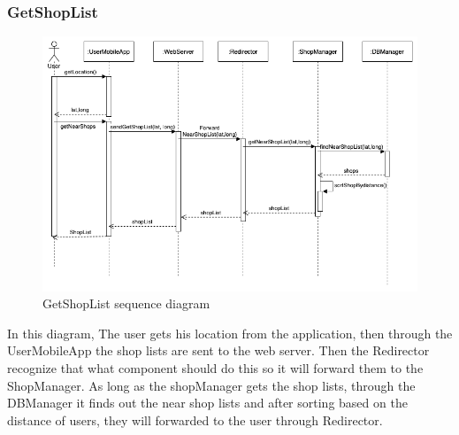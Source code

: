 \subsubsection{GetShopList}
\begin{figure}[H]
  \centering
  \includegraphics[width=\textwidth, keepaspectratio]{images/sequences/GetShopList.png}
  \caption{GetShopList sequence diagram}
\end{figure}
\vspace{2cm}
In this diagram, The user gets his location from the application, then through the UserMobileApp the shop lists are sent to the web server. Then the Redirector recognize that what component should do this so it will forward them to the ShopManager. As long as the shopManager gets the shop lists, through the DBManager it finds out the near shop lists and after sorting based on the distance of users, they will forwarded to the user through Redirector.

